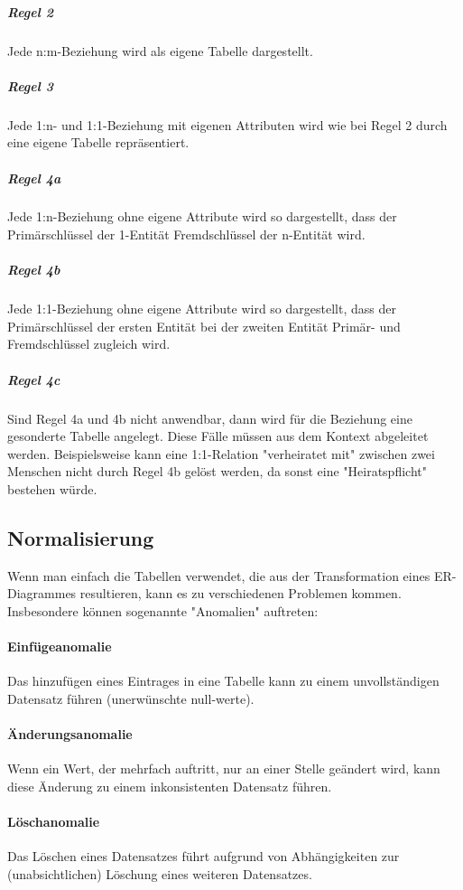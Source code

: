 \documentclass{article}
\begin{document}
	\subparagraph{Regel 2}
	Jede n:m-Beziehung wird als eigene Tabelle dargestellt.

	\subparagraph{Regel 3}
	Jede 1:n- und 1:1-Beziehung mit eigenen Attributen wird wie bei Regel 2 durch eine eigene Tabelle repräsentiert.

	\subparagraph{Regel 4a}
	Jede 1:n-Beziehung ohne eigene Attribute wird so dargestellt, dass der Primärschlüssel der 1-Entität Fremdschlüssel der n-Entität wird.

	\subparagraph{Regel 4b}
	Jede 1:1-Beziehung ohne eigene Attribute wird so dargestellt, dass der Primärschlüssel der ersten Entität bei der zweiten Entität Primär- und Fremdschlüssel zugleich wird.

	\subparagraph{Regel 4c}
	Sind Regel 4a und 4b nicht anwendbar, dann wird für die Beziehung eine gesonderte Tabelle angelegt. Diese Fälle müssen aus dem Kontext abgeleitet werden.
	Beispielsweise kann eine 1:1-Relation "verheiratet mit" zwischen zwei Menschen nicht durch Regel 4b gelöst werden, da sonst eine "Heiratspflicht" bestehen würde.

	\subsection{Normalisierung}
	Wenn man einfach die Tabellen verwendet, die aus der Transformation eines ER-Diagrammes resultieren, kann es zu verschiedenen Problemen kommen. Insbesondere können sogenannte "Anomalien" auftreten:

	\paragraph{Einfügeanomalie}
	Das hinzufügen eines Eintrages in eine Tabelle kann zu einem unvollständigen Datensatz führen (unerwünschte null-werte).

	\paragraph{Änderungsanomalie}
	Wenn ein Wert, der mehrfach auftritt, nur an einer Stelle geändert wird, kann diese Änderung zu einem inkonsistenten Datensatz führen.

	\paragraph{Löschanomalie}
	Das Löschen eines Datensatzes führt aufgrund von Abhängigkeiten zur (unabsichtlichen) Löschung eines weiteren Datensatzes.
\end{document}
